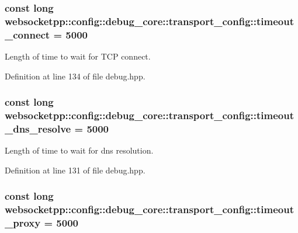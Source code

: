 \subsubsection[{timeout\+\_\+connect}]{\setlength{\rightskip}{0pt plus 5cm}const long websocketpp\+::config\+::debug\+\_\+core\+::transport\+\_\+config\+::timeout\+\_\+connect = 5000\hspace{0.3cm}{\ttfamily [static]}}\label{structwebsocketpp_1_1config_1_1debug__core_1_1transport__config_a467d99957d7b4d5c098f3b916bd97b25}


Length of time to wait for T\+C\+P connect. 



Definition at line 134 of file debug.\+hpp.

\hypertarget{structwebsocketpp_1_1config_1_1debug__core_1_1transport__config_ad794c743717ee26be023e88c7db07163}{}
\subsubsection[{timeout\+\_\+dns\+\_\+resolve}]{\setlength{\rightskip}{0pt plus 5cm}const long websocketpp\+::config\+::debug\+\_\+core\+::transport\+\_\+config\+::timeout\+\_\+dns\+\_\+resolve = 5000\hspace{0.3cm}{\ttfamily [static]}}\label{structwebsocketpp_1_1config_1_1debug__core_1_1transport__config_ad794c743717ee26be023e88c7db07163}


Length of time to wait for dns resolution. 



Definition at line 131 of file debug.\+hpp.

\hypertarget{structwebsocketpp_1_1config_1_1debug__core_1_1transport__config_a0507e22be26d0e96170b3e3ef2fe8ff6}{}
\subsubsection[{timeout\+\_\+proxy}]{\setlength{\rightskip}{0pt plus 5cm}const long websocketpp\+::config\+::debug\+\_\+core\+::transport\+\_\+config\+::timeout\+\_\+proxy = 5000\hspace{0.3cm}{\ttfamily [static]}}\label{structwebsocketpp_1_1config_1_1debug__core_1_1transport__config_a0507e22be26d0e96170b3e3ef2fe8ff6}


